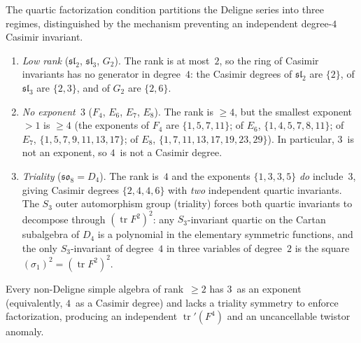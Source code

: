 \begin{remark}
\label{rem:ht-twistor-three-regimes}
The quartic factorization condition partitions the Deligne
series into three regimes, distinguished by the mechanism
preventing an independent degree-$4$ Casimir invariant.

\begin{enumerate}[label=\textup{(\roman*)}]
\item \emph{Low rank}
 ($\mathfrak{sl}_2$, $\mathfrak{sl}_3$, $G_2$).
 The rank is at most~$2$, so the ring of Casimir invariants
 has no generator in degree~$4$: the Casimir degrees of
 $\mathfrak{sl}_2$ are $\{2\}$, of $\mathfrak{sl}_3$ are
 $\{2,3\}$, and of $G_2$ are $\{2,6\}$.

\item \emph{No exponent~$3$}
 ($F_4$, $E_6$, $E_7$, $E_8$).
 The rank is $\geq 4$, but the smallest exponent $> 1$ is
 $\geq 4$ (the exponents of $F_4$ are
 $\{1,5,7,11\}$; of $E_6$, $\{1,4,5,7,8,11\}$;
 of $E_7$, $\{1,5,7,9,11,13,17\}$;
 of $E_8$, $\{1,7,11,13,17,19,23,29\}$).
 In particular, $3$~is not an exponent, so $4$~is not a
 Casimir degree.

\item \emph{Triality}
 ($\mathfrak{so}_8 = D_4$).
 The rank is~$4$ and the exponents $\{1,3,3,5\}$
 \emph{do} include~$3$, giving Casimir degrees
 $\{2,4,4,6\}$ with \emph{two} independent quartic
 invariants.
 The $S_3$ outer automorphism group (triality) forces
 both quartic invariants to decompose through
 $(\operatorname{tr} F^2)^2$: any
 $S_3$-invariant quartic on the Cartan subalgebra of
 $D_4$ is a polynomial in the elementary symmetric
 functions, and the only $S_3$-invariant of degree~$4$
 in three variables of degree~$2$ is the square
 $(\sigma_1)^2 = (\operatorname{tr} F^2)^2$.
\end{enumerate}

\noindent
Every non-Deligne simple algebra of rank~$\geq 2$ has
$3$~as an exponent (equivalently, $4$~as a Casimir
degree) and lacks a triality symmetry to enforce
factorization, producing an independent
$\operatorname{tr}'(F^4)$ and an uncancellable twistor
anomaly.
\end{remark}

